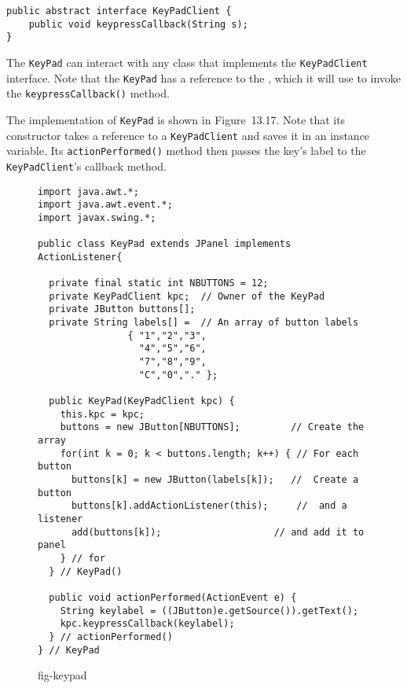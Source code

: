 \begin{jjjlisting}
\begin{lstlisting}
public abstract interface KeyPadClient {
    public void keypressCallback(String s);
}
\end{lstlisting}
\end{jjjlisting}

\noindent The {\tt KeyPad} can interact with any class that implements 
the {\tt Key\-Pad\-Client} interface.  Note that the {\tt KeyPad} has a
reference to the , which it will use to invoke the
{\tt keypressCallback()} method.

The implementation of {\tt KeyPad} is shown in Figure~13.17. 
Note that its constructor takes a reference to a {\tt KeyPadClient}
and saves it in an instance variable. Its {\tt actionPerformed()}
method then passes the key's label to the {\tt KeyPadClient}'s 
callback method.

\begin{figure}[hbt]
\jjjprogstart
\begin{jjjlisting}[29pc]
\begin{lstlisting}
import java.awt.*;
import java.awt.event.*;
import javax.swing.*;

public class KeyPad extends JPanel implements ActionListener{
 
  private final static int NBUTTONS = 12;  
  private KeyPadClient kpc;  // Owner of the KeyPad
  private JButton buttons[];
  private String labels[] =  // An array of button labels
                { "1","2","3",
                  "4","5","6",
                  "7","8","9",
                  "C","0","." };

  public KeyPad(KeyPadClient kpc) {
    this.kpc = kpc;
    buttons = new JButton[NBUTTONS];         // Create the array
    for(int k = 0; k < buttons.length; k++) { // For each button
      buttons[k] = new JButton(labels[k]);   //  Create a button
      buttons[k].addActionListener(this);     //  and a listener
      add(buttons[k]);                    // and add it to panel
    } // for
  } // KeyPad()

  public void actionPerformed(ActionEvent e) {
    String keylabel = ((JButton)e.getSource()).getText();
    kpc.keypressCallback(keylabel);
  } // actionPerformed()
} // KeyPad
\end{lstlisting}
\end{jjjlisting}
{fig-keypad}
\end{figure}

